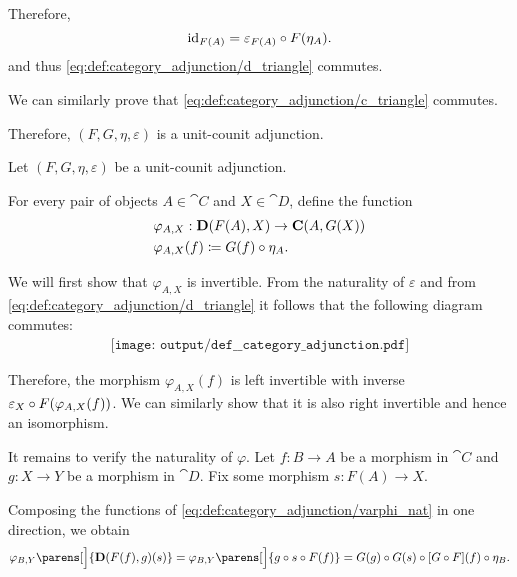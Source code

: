 \begin{defproof}
  Therefore,
  \begin{equation*}
    \id_{F(A)} = \varepsilon_{F(A)} \bincirc F(\eta_A).
  \end{equation*}
  and thus \eqref{eq:def:category_adjunction/d_triangle} commutes.

  We can similarly prove that \eqref{eq:def:category_adjunction/c_triangle} commutes.

  Therefore, \( (F, G, \eta, \varepsilon) \) is a unit-counit adjunction.

   Let \( (F, G, \eta, \varepsilon) \) be a unit-counit adjunction.

  For every pair of objects \( A \in \cat{C} \) and \( X \in \cat{D} \), define the function
  \begin{equation*}
    \begin{aligned}
      &\varphi_{A,X}: \cat{D}(F(A), X) \to \cat{C}(A, G(X)) \\
      &\varphi_{A,X}(f) \coloneqq G(f) \bincirc \eta_A.
    \end{aligned}
  \end{equation*}

  We will first show that \( \varphi_{A,X} \) is invertible. From the naturality of \( \varepsilon \) and from \eqref{eq:def:category_adjunction/d_triangle} it follows that the following diagram commutes:
  \begin{equation}\label{eq:def:category_adjunction/varphi_inverse_def}
    \begin{aligned}
      \texttt{[image: output/def\_\_category\_adjunction.pdf]}
    \end{aligned}
  \end{equation}

  Therefore, the morphism \( \varphi_{A,X}(f) \) is left invertible with inverse \( \varepsilon_X \bincirc F(\varphi_{A,X}(f)) \). We can similarly show that it is also right invertible and hence an isomorphism.

  It remains to verify the naturality of \( \varphi \). Let \( f: B \to A \) be a morphism in \( \cat{C} \) and \( g: X \to Y \) be a morphism in \( \cat{D} \). Fix some morphism \( s: F(A) \to X \).

  Composing the functions of \eqref{eq:def:category_adjunction/varphi_nat} in one direction, we obtain
  \begin{equation}\label{eq:def:category_adjunction/varphi_nat_chase_right}
    \varphi_{B, Y}\parens[\Big]{ \cat{D}(F(f), g)(s) }
    =
    \varphi_{B, Y}\parens[\Big]{ g \bincirc s \bincirc F(f) }
    =
    G(g) \bincirc G(s) \bincirc [G \bincirc F](f) \bincirc \eta_B.
  \end{equation}


\end{defproof}
